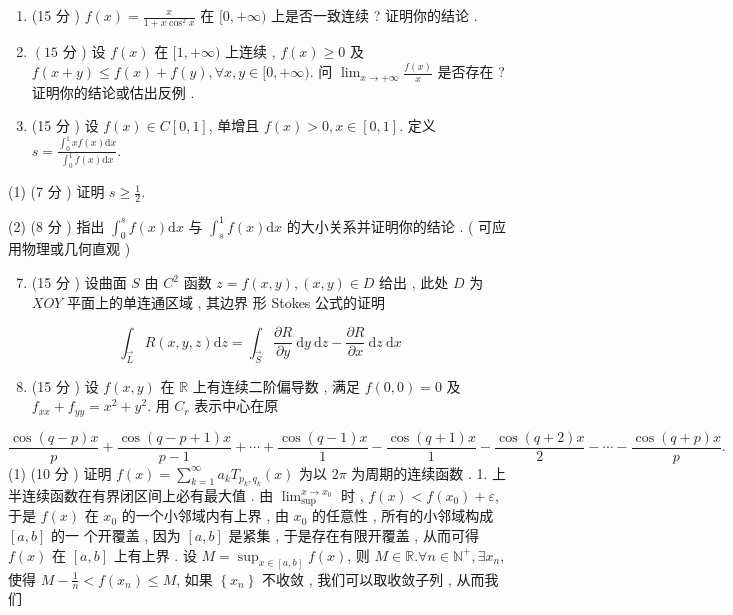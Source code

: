 \documentclass[10pt]{article}
\begin{document}
{\begin{enumerate}
  \item (15  分 ) $f(x)=\frac{x}{1+x \cos ^{2} x}$  在  $[0,+\infty)$  上是否一致连续 ?  证明你的结论 .

  \item $\left(15\right.$  分 )  设  $f(x)$  在  $[1,+\infty)$  上连续 , $f(x) \geqslant 0$  及  $f(x+y) \leqslant f(x)+f(y), \forall x, y \in[0,+\infty)$.  问  $\lim _{x \rightarrow+\infty} \frac{f(x)}{x}$  是否存在 ?  证明你的结论或估出反例 .

  \item (15  分 )  设  $f(x) \in C[0,1]$,  单增且  $f(x)>0, x \in[0,1]$.  定义  $s=\frac{\int_{0}^{1} x f(x) \mathrm{d} x}{\int_{0}^{1} f(x) \mathrm{d} x}$.

\end{enumerate}
(1) (7  分 )  证明  $s \geqslant \frac{1}{2}$.

(2) (8  分 )  指出  $\int_{0}^{s} f(x) \mathrm{d} x$  与  $\int_{s}^{1} f(x) \mathrm{d} x$  的大小关系并证明你的结论 . ( 可应用物理或几何直观 )

\begin{enumerate}
  \setcounter{enumi}{6}
  \item (15  分 )  设曲面  $S$  由  $C^{2}$  函数  $z=f(x, y),(x, y) \in D$  给出 ,  此处  $D$  为  $X O Y$  平面上的单连通区域 ,  其边界   形  Stokes  公式的证明 
\end{enumerate}
$$
\int_{\vec{L}} R(x, y, z) \mathrm{d} z=\int_{\vec{S}} \frac{\partial R}{\partial y} \mathrm{~d} y \mathrm{~d} z-\frac{\partial R}{\partial x} \mathrm{~d} z \mathrm{~d} x
$$

\begin{enumerate}
  \setcounter{enumi}{7}
  \item (15  分 )  设  $f(x, y)$  在  $\mathbb{R}$  上有连续二阶偏导数 ,  满足  $f(0,0)=0$  及  $f_{x x}+f_{y y}=x^{2}+y^{2}$.  用  $C_{r}$  表示中心在原 
\end{enumerate}
$$
\frac{\cos (q-p) x}{p}+\frac{\cos (q-p+1) x}{p-1}+\cdots+\frac{\cos (q-1) x}{1}-\frac{\cos (q+1) x}{1}-\frac{\cos (q+2) x}{2}-\cdots-\frac{\cos (q+p) x}{p} .
$$
(1) (10  分 )  证明  $f(x)=\sum_{k=1}^{\infty} a_{k} T_{p_{k}, q_{k}}(x)$  为以  $2 \pi$  为周期的连续函数 . 1.  上半连续函数在有界闭区间上必有最大值 .  由  $\lim _{\sup }^{x \rightarrow x_{0}}$  时 , $f(x)<f\left(x_{0}\right)+\varepsilon$,  于是  $f(x)$  在  $x_{0}$  的一个小邻域内有上界 ,  由  $x_{0}$  的任意性 ,  所有的小邻域构成  $[a, b]$  的一   个开覆盖 ,  因为  $[a, b]$  是紧集 ,  于是存在有限开覆盖 ,  从而可得  $f(x)$  在  $[a, b]$  上有上界 .  设  $M=\sup _{x \in[a, b]} f(x)$,  则  $M \in \mathbb{R} . \forall n \in \mathbb{N}^{+}, \exists x_{n}$,  使得  $M-\frac{1}{n}<f\left(x_{n}\right) \leqslant M$,  如果  $\left\{x_{n}\right\}$  不收敛 ,  我们可以取收敛子列 ,  从而我们 

}
\end{document}
